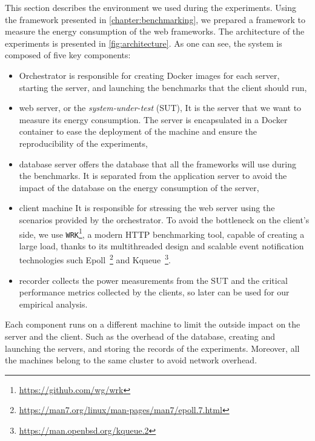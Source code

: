 This section describes the environment we used during the experiments. Using the framework presented in \cref*{chapter:benchmarking}, we prepared a framework to measure the energy consumption of the web frameworks. The architecture of the experiments is presented in \cref{fig:architecture}.
As one can see, the system is composed of five key components:

\begin{itemize}
    \item \textsf{Orchestrator} is responsible for creating Docker images for each server, starting the server, and launching the benchmarks that the client should run,
    \item \textsf{web server}, or the \emph{system-under-test} (SUT), It is the server that we want to measure its energy consumption. The server is encapsulated in a Docker container to ease the deployment of the machine and ensure the reproducibility of the experiments,
    \item \textsf{database server} offers the database that all the frameworks will use during the benchmarks. It is separated from the application server to avoid the impact of the database on the energy consumption of the server,
    \item \textsf{client machine} It is responsible for stressing the web server using the scenarios provided by the orchestrator. To avoid the bottleneck on the client's side, we use \texttt{WRK}\footnote{\url{https://github.com/wg/wrk}}, a modern HTTP benchmarking tool,  capable of creating a large load, thanks to its multithreaded design and scalable event notification technologies such Epoll~\footnote{\url{https://man7.org/linux/man-pages/man7/epoll.7.html}} and Kqueue~\footnote{\url{https://man.openbsd.org/kqueue.2}}.
    \item \textsf{recorder} collects the power measurements from the SUT and the critical performance metrics collected by the clients, so later can be used for our empirical analysis.
\end{itemize}

Each component runs on a different machine to limit the outside impact on the server and the client. Such as the overhead of the database, creating and launching the servers, and storing the records of the experiments.
Moreover, all the machines belong to the same cluster to avoid network overhead.


